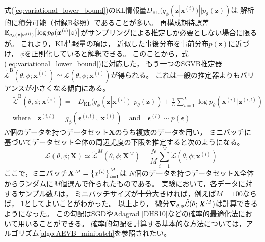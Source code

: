 \documentclass[dvipdfmx, fleqn]{jsarticle}
\begin{document}
式(\ref{eq:variational_lower_bound})のKL情報量\(D_\mathrm{KL} (q_{\phi} (\bm{z} | \bm{x}^{(i)}) || p_{\theta} (\bm{z}))\)は
解析的に積分可能（付録B参照）であることが多い。
再構成期待誤差\(\mathbb{E}_{q_{\phi} (\bm{z} | \bm{x}^{(i)})} \qty[\log{p_{\theta} (\bm{x}^{(i)} | \bm{z})}]\)がサンプリングによる推定しか必要としない場合に限るが。
これより，KL情報量の項は，
近似した事後分布を事前分布\(p(\bm{z})\)に近づけ，
\(\phi\)を正則化していると解釈できる。
このことから，式(\ref{eq:variational_lower_bound})に対応した，
もう一つのSGVB推定器
\(\tilde{\mathcal{L}}^\mathrm{B} (\theta, \phi; \bm{x}^{(i)}) \simeq \mathcal{L} (\theta, \phi; \bm{x}^{(i)})\)が得られる。
これは一般の推定器よりもバリアンスが小さくなる傾向にある。
\begin{equation}
    \begin{split}
    & \tilde{\mathcal{L}}^\mathrm{B} (\theta, \phi; \bm{x}^{(i)})
        = - D_\mathrm{KL} (q_{\phi} (\bm{z} | \bm{x}^{(i)}) || p_{\theta} (\bm{z}))
            + \frac{1}{L} \sum_{i=1}^{L} \log{p_{\theta} (\bm{x}^{(i)} | \bm{z}^{(i, l)})} \\
    & \text{where} \quad
        \bm{z}^{(i, l)} = g_{\phi} (\bm{\epsilon}^{(i, l)},\ \bm{x}^{(i)})
        \quad \text{and} \quad
        \bm{\epsilon}^{(l)} \sim p(\bm{\epsilon})
    \end{split}
    \label{eq:SGVB_estimator_B}
\end{equation}
\(N\)個のデータを持つデータセット\(\bm{X}\)のうち複数のデータを用い，
ミニバッチに基づいてデータセット全体の周辺尤度の下限を推定すると次のようになる。
\begin{equation}
    \mathcal{L} (\theta, \phi; \bm{X})
        \simeq \tilde{\mathcal{L}}^{M} (\theta, \phi; \bm{X}^{M})
        = \frac{N}{M} \sum_{i=1}^{M} \tilde{\mathcal{L}} (\theta, \phi; \bm{x}^{(i)})
    \label{eq:variational_lower_bound_minibatch}
\end{equation}
ここで，ミニバッチ\(\bm{X}^{M} = \qty{x^{(i)}}_{i=1}^{M}\)は
\(N\)個のデータを持つデータセット\(\bm{X}\)全体からランダムに\(M\)個選んで作られたものである。
実験において，各データに対するサンプル数\(L\)は，
ミニバッチサイズが十分大きければ，例えば\(M = 100\)ならば，
1としてよいことがわかった。
以上より，
微分\(\grad_{\theta, \phi} \tilde{\mathcal{L}} (\theta; \bm{X}^{M})\)は計算できるようになった。
この勾配はSGDやAdagrad [DHS10]などの確率的最適化法において用いることができる。
確率的勾配を計算する基本的な方法については，アルゴリズム\ref{algo:AEVB_minibatch}を参照されたい。
\end{document}
